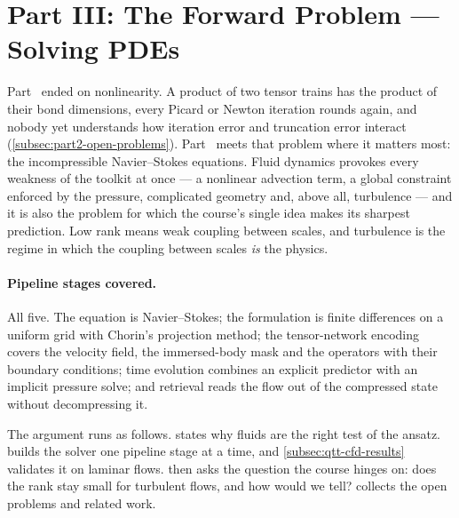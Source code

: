 \section{Part III: The Forward Problem --- Solving PDEs}
\label{sec:part3}


Part~ ended on nonlinearity. A product of two tensor trains has the
product of their bond dimensions, every Picard or Newton iteration rounds again,
and nobody yet understands how iteration error and truncation error interact
(\cref{subsec:part2-open-problems}). Part~ meets that problem where
it matters most: the incompressible Navier--Stokes equations. Fluid dynamics
provokes every weakness of the toolkit at once --- a nonlinear advection term, a
global constraint enforced by the pressure, complicated geometry and, above all,
turbulence --- and it is also the problem for which the course's single idea
makes its sharpest prediction. Low rank means weak coupling between scales, and
turbulence is the regime in which the coupling between scales \emph{is} the
physics.

\paragraph{Pipeline stages covered.}
All five. The equation is Navier--Stokes; the formulation is finite
differences on a uniform grid with Chorin's projection method; the
tensor-network encoding covers the velocity field, the immersed-body mask and the
operators with their boundary conditions; time evolution combines an explicit
predictor with an implicit pressure solve; and retrieval reads the flow out of
the compressed state without decompressing it.

The argument runs as follows.  states why fluids
are the right test of the ansatz.  builds the
solver one pipeline stage at a time, and \cref{subsec:qtt-cfd-results} validates
it on laminar flows.  then asks the question the
course hinges on: does the rank stay small for turbulent flows, and how would we
tell?  collects the open problems and related work.

